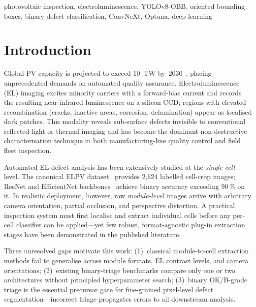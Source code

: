 \documentclass[conference]{IEEEtran}
\begin{document}
\begin{IEEEkeywords}
photovoltaic inspection, electroluminescence, YOLOv8-OBB, oriented bounding boxes, binary defect classification, ConvNeXt, Optuna, deep learning
\end{IEEEkeywords}

\section{Introduction}

Global PV capacity is projected to exceed 10~TW by~2030~\cite{iea2023}, placing unprecedented demands on automated quality assurance. Electroluminescence (EL) imaging excites minority carriers with a forward-bias current and records the resulting near-infrared luminescence on a silicon CCD; regions with elevated recombination (cracks, inactive areas, corrosion, delamination) appear as localised dark patches. This modality reveals sub-surface defects invisible to conventional reflected-light or thermal imaging and has become the dominant non-destructive characterisation technique in both manufacturing-line quality control and field fleet inspection.

Automated EL defect analysis has been extensively studied at the \textit{single-cell} level. The canonical ELPV dataset~\cite{deitsch2019} provides 2{,}624 labelled cell-crop images; ResNet and EfficientNet backbones~\cite{he2016,tan2019} achieve binary accuracy exceeding 90\,\% on it. In realistic deployment, however, raw \textit{module-level} images arrive with arbitrary camera orientation, partial occlusion, and perspective distortion. A practical inspection system must first localise and extract individual cells before any per-cell classifier can be applied---yet few robust, format-agnostic plug-in extraction stages have been demonstrated in the published literature.

Three unresolved gaps motivate this work: (1)~classical module-to-cell extraction methods fail to generalise across module formats, EL contrast levels, and camera orientations; (2)~existing binary-triage benchmarks compare only one or two architectures without principled hyperparameter search; (3)~binary OK/B-grade triage is the essential precursor gate for fine-grained pixel-level defect segmentation---incorrect triage propagates errors to all downstream analysis.
\end{document}
